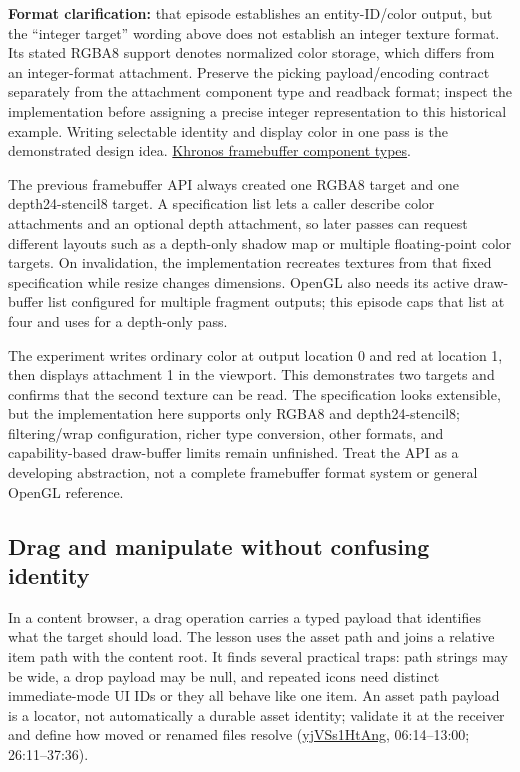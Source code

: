 \textbf{Format clarification:} that episode establishes an entity-ID/color output, but the ``integer target'' wording above does not establish an integer texture format. Its stated RGBA8 support denotes normalized color storage, which differs from an integer-format attachment. Preserve the picking payload/encoding contract separately from the attachment component type and readback format; inspect the implementation before assigning a precise integer representation to this historical example. Writing selectable identity and display color in one pass is the demonstrated design idea. \href{https://registry.khronos.org/OpenGL/specs/gl/glspec30.pdf}{Khronos framebuffer component types}.

The previous framebuffer API always created one RGBA8 target and one depth24-stencil8 target. A specification list lets a caller describe color attachments and an optional depth attachment, so later passes can request different layouts such as a depth-only shadow map or multiple floating-point color targets. On invalidation, the implementation recreates textures from that fixed specification while resize changes dimensions. OpenGL also needs its active draw-buffer list configured for multiple fragment outputs; this episode caps that list at four and uses  for a depth-only pass.

The experiment writes ordinary color at output location 0 and red at location 1, then displays attachment 1 in the viewport. This demonstrates two targets and confirms that the second texture can be read. The specification looks extensible, but the implementation here supports only RGBA8 and depth24-stencil8; filtering/wrap configuration, richer type conversion, other formats, and capability-based draw-buffer limits remain unfinished. Treat the API as a developing abstraction, not a complete framebuffer format system or general OpenGL reference.

\subsection{Drag and manipulate without confusing identity}\label{06-engine-ii-ch031-drag-and-manipulate-without-confusing-identity}

\hypertarget{06-engine-ii-ch031-drag-and-manipulate-without-confusing-identity}{}

In a content browser, a drag operation carries a typed payload that identifies what the target should load. The lesson uses the asset path and joins a relative item path with the content root. It finds several practical traps: path strings may be wide, a drop payload may be null, and repeated icons need distinct immediate-mode UI IDs or they all behave like one item. An asset path payload is a locator, not automatically a durable asset identity; validate it at the receiver and define how moved or renamed files resolve (\href{https://www.youtube.com/watch?v=yjVSs1HtAng}{yjVSs1HtAng}, 06:14--13:00; 26:11--37:36).

